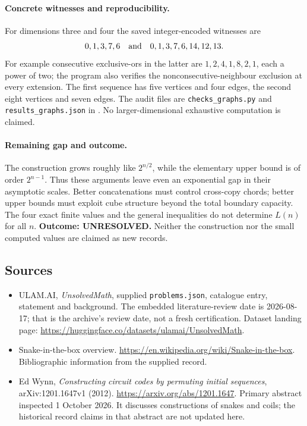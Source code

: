 \documentclass[11pt,a4paper]{article}
\begin{document}
\paragraph{Concrete witnesses and reproducibility.}
For dimensions three and four the saved integer-encoded witnesses are
\[
                 0,1,3,7,6
                 \quad\hbox{and}\quad
                 0,1,3,7,6,14,12,13.
\]
For example consecutive exclusive-ors in the latter are
$1,2,4,1,8,2,1$, each a power of two; the program also verifies the
nonconsecutive-neighbour exclusion at every extension. The first
sequence has five vertices and four edges, the second eight vertices
and seven edges. The audit files are \texttt{checks\_graphs.py} and
\texttt{results\_graphs.json} in
.
No larger-dimensional exhaustive computation is claimed.

\paragraph{Remaining gap and outcome.}
The construction grows roughly like $2^{n/2}$, while the elementary
upper bound is of order $2^{n-1}$. Thus these arguments leave even an
exponential gap in their asymptotic scales. Better concatenations must
control cross-copy chords; better upper bounds must exploit cube
structure beyond the total boundary capacity. The four exact finite
values and the general inequalities do not determine $L(n)$ for all
$n$. \textbf{Outcome: UNRESOLVED.} Neither the construction nor the
small computed values are claimed as new records.

\subsection{Sources}

{\small

\begin{itemize}

\item[\hypertarget{source:statement:1}{S1}] ULAM.AI, \emph{UnsolvedMath}, supplied \texttt{problems.json}, catalogue entry, statement and background. The embedded literature-review date is 2026-08-17; that is the archive’s review date, not a fresh certification. Dataset landing page: \url{https://huggingface.co/datasets/ulamai/UnsolvedMath}.

\item[\hypertarget{source:statement:2}{S2}] Snake-in-the-box overview. \url{https://en.wikipedia.org/wiki/Snake-in-the-box}. Bibliographic information from the supplied record.


\item[E1] Ed Wynn, \emph{Constructing circuit codes
by permuting initial sequences}, arXiv:1201.1647v1 (2012).
\url{https://arxiv.org/abs/1201.1647}. Primary abstract inspected
1 October 2026. It discusses constructions of snakes and coils;
the historical record claims in that abstract are not updated here.

\end{itemize}

}

\label{end:statement}
\end{document}
